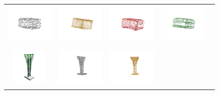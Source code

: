 \documentclass[bachelor, nocolorlinks, printoneside]{seuthesis} %
\begin{document}
\begin{Appendix}{}
\begin{figure}[!h]
\begin{tabular}{c@{}c@{}c@{}c@{}c@{}}
            \includegraphics[width=0.18\columnwidth,height=2cm]{figs/supp_real_dataset/GT/table_3942f02501161134c3bd24f986301745_gt.png} &
            \includegraphics[width=0.18\columnwidth,height=2cm]{figs/supp_real_dataset/AE_label/table_3942f02501161134c3bd24f986301745_label.png} &
            \includegraphics[width=0.18\columnwidth,height=2cm]{figs/supp_real_dataset/AE/table_3942f02501161134c3bd24f986301745_pred.png} &
            \includegraphics[width=0.18\columnwidth,height=2cm]{figs/supp_real_dataset/oracle/table_3942f02501161134c3bd24f986301745_oracle.png} \\
            \vspace{-5mm}
            \includegraphics[width=0.11\columnwidth,height=1.7cm]{figs/supp_real_dataset/Image/tower_f584f1a14904b958ba9419f3b43eb3bd.png} &
            \includegraphics[width=0.18\columnwidth,height=2cm]{figs/supp_real_dataset/GT/tower_f584f1a14904b958ba9419f3b43eb3bd_gt.png} &
            \includegraphics[width=0.18\columnwidth,height=2cm]{figs/supp_real_dataset/AE_label/tower_f584f1a14904b958ba9419f3b43eb3bd_label.png} &

\end{tabular}
\end{figure}
\end{Appendix}
\end{document}
